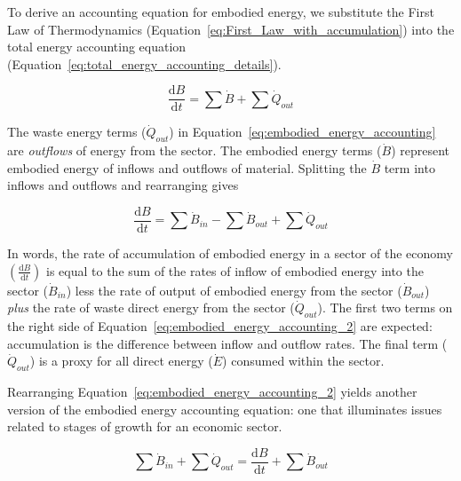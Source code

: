 To derive an accounting equation for embodied energy, we substitute the 
First Law of Thermodynamics (Equation~\ref{eq:First_Law_with_accumulation})
into the total energy accounting equation (Equation~\ref{eq:total_energy_accounting_details}).

\begin{equation} \label{eq:embodied_energy_accounting}
	\frac{\mathrm{d}B}{\mathrm{d}t}
	= \sum \dot{B} 
	+ \sum \dot{Q}_{out}
\end{equation}

The waste energy terms ($\dot{Q}_{out}$) 
in Equation~\ref{eq:embodied_energy_accounting}
are \emph{outflows} of energy from the sector. 
The embodied energy 
terms ($\dot{B}$) represent embodied energy of inflows
and outflows of material. Splitting the $\dot{B}$ term
into inflows and outflows and rearranging gives

\begin{equation} \label{eq:embodied_energy_accounting_2}
	\frac{\mathrm{d}B}{\mathrm{d}t}
	= \sum \dot{B}_{in}
	- \sum \dot{B}_{out} 
	+ \sum \dot{Q}_{out}
\end{equation}

In words, the rate of accumulation of embodied energy 
in a sector of the economy 
$\left( \frac{\mathrm{d}B}{\mathrm{d}t} \right)$ 
is equal to the sum of the rates of 
inflow of embodied energy into the sector 
	($\dot{B}_{in}$) 
less the rate of output of embodied energy from the sector 
	($\dot{B}_{out}$) 
\emph{plus} the rate of waste direct energy from the sector 
	($\dot{Q}_{out}$). 
The first two terms on the right side of
Equation~\ref{eq:embodied_energy_accounting_2} are expected: 
accumulation is the difference between inflow and outflow rates. 
The final term ($\dot{Q}_{out}$) is a proxy 
for all direct energy ($\dot{E}$) consumed within the sector.

Rearranging Equation~\ref{eq:embodied_energy_accounting_2}
yields another version of the embodied energy accounting equation:
one that illuminates issues related to 
stages of growth for an economic sector.

\begin{equation} \label{eq:embodied_energy_accounting_3}
	\sum \dot{B}_{in}
	+ \sum \dot{Q}_{out}
	= \frac{\mathrm{d}B}{\mathrm{d}t} 
	+ \sum \dot{B}_{out}
\end{equation}

